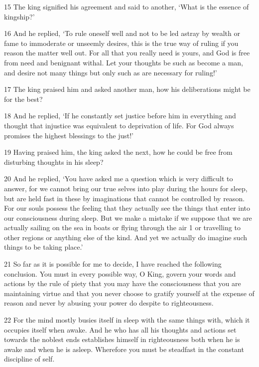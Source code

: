 \par 15 The king signified his agreement and said to another, ‘What is the essence of kingship?’

\par 16 And he replied, ‘To rule oneself well and not to be led astray by wealth or fame to immoderate or unseemly desires, this is the true way of ruling if you reason the matter well out. For all that you really need is yours, and God is free from need and benignant withal. Let your thoughts be such as become a man, and desire not many things but only such as are necessary for ruling!’

\par 17 The king praised him and asked another man, how his deliberations might be for the best?

\par 18 And he replied, ‘If he constantly set justice before him in everything and thought that injustice was equivalent to deprivation of life. For God always promises the highest blessings to the just!’

\par 19 Having praised him, the king asked the next, how he could be free from disturbing thoughts in his sleep?

\par 20 And he replied, ‘You have asked me a question which is very difficult to answer, for we cannot bring our true selves into play during the hours for sleep, but are held fast in these by imaginations that cannot be controlled by reason. For our souls possess the feeling that they actually see the things that enter into our consciousness during sleep. But we make a mistake if we suppose that we are actually sailing on the sea in boats or flying through the air 1 or travelling to other regions or anything else of the kind. And yet we actually do imagine such things to be taking place.’

\par 21 So far as it is possible for me to decide, I have reached the following conclusion. You must in every possible way, O King, govern your words and actions by the rule of piety that you may have the consciousness that you are maintaining virtue and that you never choose to gratify yourself at the expense of reason and never by abusing your power do despite to righteousness.

\par 22 For the mind mostly busies itself in sleep with the same things with, which it occupies itself when awake. And he who has all his thoughts and actions set towards the noblest ends establishes himself in righteousness both when he is awake and when he is asleep. Wherefore you must be steadfast in the constant discipline of self.

